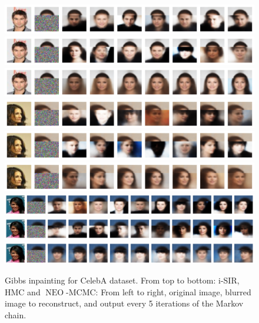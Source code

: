 \documentclass{article}
\def\IFIS{\ensuremath{\operatorname{NEO}}}
\def\NEO{{\small \IFIS}}
\newcommand{\1}{\mathds{1}}
\begin{document}
 \begin{figure}
     \centering
     \includegraphics[width = .99\linewidth]{celeba_inpainting_isir_w_supp_1.pdf}
\includegraphics[width = .99\linewidth]{celeba_inpainting_hmc_w_supp.pdf}
\includegraphics[width = .99\linewidth]{celeba_inpainting_neo_w_supp.pdf}
\vspace{10pt}
\\
     \includegraphics[width = .99\linewidth]{celeba_inpainting_isir_w_supp_2.pdf}
\includegraphics[width = .99\linewidth]{celeba_inpainting_hmc_w_supp_2.pdf}
\includegraphics[width = .99\linewidth]{celeba_inpainting_neo_w_supp_2.pdf}
\vspace{10pt}
\\
     \includegraphics[width = .99\linewidth]{celeba_inpainting_isir_w_supp_3.pdf}
\includegraphics[width = .99\linewidth]{celeba_inpainting_hmc_w_supp_3.pdf}
\includegraphics[width = .99\linewidth]{celeba_inpainting_neo_w_supp_3.pdf}
     \caption{Gibbs inpainting for CelebA dataset. 
    From top to bottom: i-SIR, HMC and \NEO-MCMC: From left to right, original image, blurred image to reconstruct, and output every 5 iterations of the Markov chain.}
     \label{fig:gibbs_inpainting}
 \end{figure}
\end{document}
